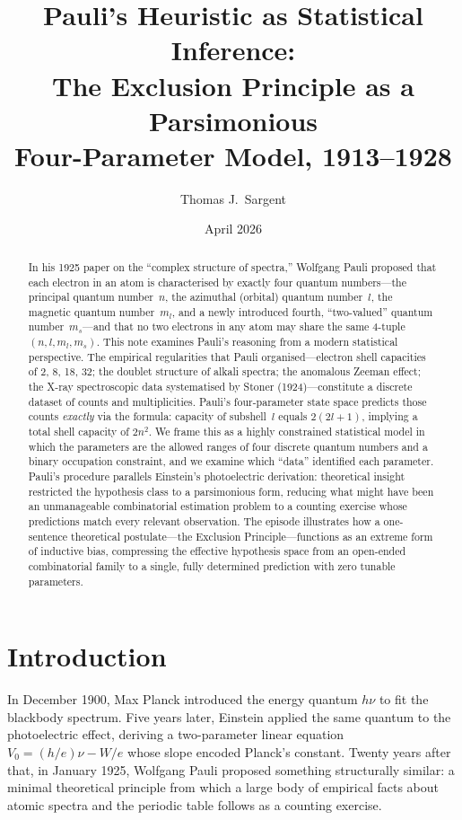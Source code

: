 \documentclass[12pt]{article}
\title{Pauli's Heuristic as Statistical Inference:\\
       The Exclusion Principle as a Parsimonious\\
       Four-Parameter Model, 1913--1928}
\author{Thomas J.\ Sargent}
\date{April 2026}
\begin{document}
\maketitle

\begin{abstract}
In his 1925 paper on the ``complex structure of spectra,'' Wolfgang Pauli
proposed that each electron in an atom is characterised by exactly four quantum
numbers---the principal quantum number~$n$, the azimuthal (orbital) quantum
number~$l$, the magnetic quantum number~$m_l$, and a newly introduced
fourth, ``two-valued'' quantum number~$m_s$---and that no two electrons in any
atom may share the same 4-tuple $(n,l,m_l,m_s)$.  This note examines Pauli's
reasoning from a modern statistical perspective.  The empirical regularities
that Pauli organised---electron shell capacities of 2, 8, 18, 32; the doublet
structure of alkali spectra; the anomalous Zeeman effect; the X-ray
spectroscopic data systematised by Stoner (1924)---constitute a discrete
dataset of counts and multiplicities.  Pauli's four-parameter state space
predicts those counts \emph{exactly} via the formula: capacity of subshell~$l$
equals $2(2l{+}1)$, implying a total shell capacity of $2n^2$.  We frame this
as a highly constrained statistical model in which the parameters are the
allowed ranges of four discrete quantum numbers and a binary occupation
constraint, and we examine which ``data'' identified each parameter.  Pauli's
procedure parallels Einstein's photoelectric derivation: theoretical insight
restricted the hypothesis class to a parsimonious form, reducing what might
have been an unmanageable combinatorial estimation problem to a counting
exercise whose predictions match every relevant observation.  The episode
illustrates how a one-sentence theoretical postulate---the Exclusion
Principle---functions as an extreme form of inductive bias, compressing
the effective hypothesis space from an open-ended combinatorial family to
a single, fully determined prediction with zero tunable parameters.
\end{abstract}

\tableofcontents

\section{Introduction}

In December 1900, Max Planck introduced the energy quantum $h\nu$ to fit the
blackbody spectrum.  Five years later, Einstein applied the same quantum to the
photoelectric effect, deriving a two-parameter linear equation
$V_0 = (h/e)\nu - W/e$ whose slope encoded Planck's constant.  Twenty years
after that, in January 1925, Wolfgang Pauli proposed something structurally
similar: a minimal theoretical principle from which a large body of empirical
facts about atomic spectra and the periodic table follows as a counting
exercise.
\end{document}
